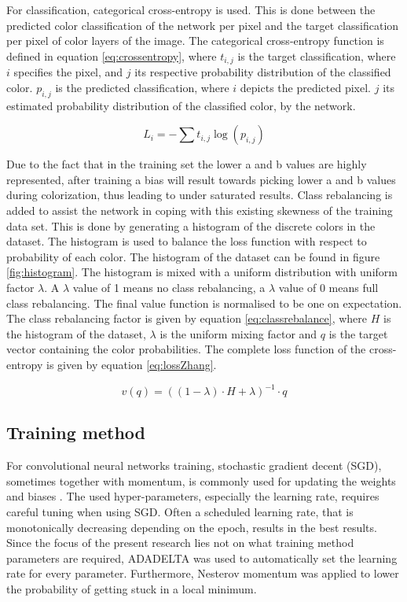 For classification, categorical cross-entropy is used. This is done between the predicted color classification of the network per pixel and the target classification per pixel of color layers of the image. The categorical cross-entropy function is defined in equation \ref{eq:crossentropy}, where $t_{i,j}$ is the target classification, where $i$ specifies the pixel, and $j$ its respective probability distribution of the classified color. 
$p_{i,j}$ is the predicted classification, where $i$ depicts the predicted pixel. $j$ its estimated probability distribution of the classified color, by the network.

\begin{equation}
\label{eq:crossentropy}
L_{i} = -\sum t_{i,j}\log(p_{i,j})
\end{equation}

Due to the fact that in the training set the lower a and b values are highly represented, after training a bias will result towards picking lower a and b values during colorization, thus leading to under saturated results. 
Class rebalancing is added to assist the network in coping with this existing skewness of the training data set. This is done by generating a histogram of the discrete colors in the dataset. The histogram is used to balance the loss function with respect to probability of each color. The histogram of the dataset can be found in figure \ref{fig:histogram}. The  histogram is mixed with a uniform distribution with uniform factor $\lambda$. A $\lambda$ value of 1 means no class rebalancing, a $\lambda$ value of 0 means full class rebalancing. The final value function is normalised to be one on expectation. The class rebalancing factor is given by equation \ref{eq:classrebalance}, where $H$ is the histogram of the dataset, $\lambda$ is the uniform mixing factor and $q$ is the target vector containing the color probabilities. The complete loss function of the cross-entropy is given by equation \ref{eq:lossZhang}.

\begin{equation}\label{eq:classrebalance}
v(q) = ((1 - \lambda)\cdot H + \lambda)^{-1} \cdot q
\end{equation}
 
\subsection{Training method}
For convolutional neural networks training, stochastic gradient decent (SGD), sometimes together with momentum, is commonly used for updating the weights and biases \cite{IizukaSIGGRAPH2016}\cite{Simonyan}. The used hyper-parameters, especially the learning rate, requires careful tuning when using SGD. Often a scheduled learning rate, that is monotonically decreasing depending on the epoch, results in the best results. Since the focus of the present research lies not on what training method parameters are required, ADADELTA was used to automatically set the learning rate for every parameter\cite{zeiler2012adadelta}. Furthermore, Nesterov momentum was applied to lower the probability of getting stuck in a local minimum\cite{sutskever2013importance}.

